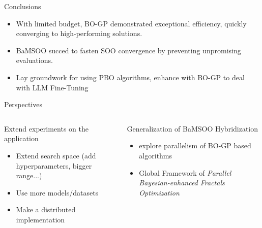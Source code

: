 \begin{frame}{Conclusions}

\begin{itemize}
    \item With limited budget, BO-GP demonstrated exceptional efficiency, quickly converging to high-performing solutions. 
    \item BaMSOO succed to fasten SOO convergence by preventing unpromising evaluations.
    \item Lay groundwork for using PBO algorithms, enhance with BO-GP to deal with LLM Fine-Tuning
\end{itemize}


\end{frame}

\begin{frame}{Perspectives}

    \begin{columns}
        \begin{column}{0.45\textwidth}

            \begin{block}{Extend experiments on the application}
                \begin{itemize}
                    \item Extend search space (add hyperparameters, bigger range...)
                    \item Use more models/datasets
                    \item Make a distributed implementation
                \end{itemize}
            \end{block}
        \end{column}

        \begin{column}{0.45\textwidth}
            \begin{block}{Generalization of BaMSOO Hybridization}

                \begin{itemize}
                    \item explore parallelism of BO-GP based algorithms
                    \item Global Framework of \textit{Parallel Bayesian-enhanced Fractals Optimization} 
                \end{itemize}
            \end{block}
        \end{column}

    \end{columns}
    
\end{frame}